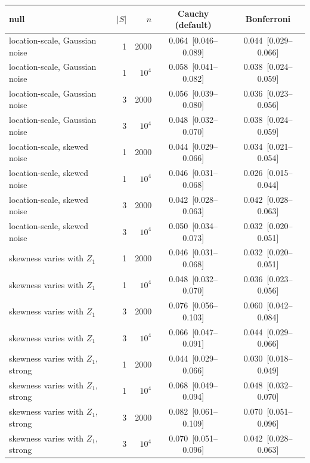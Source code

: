 \begin{tabular}{lrrcc}
\toprule
null & $|S|$ & $n$ & Cauchy (default) & Bonferroni \\
\midrule
location-scale, Gaussian noise & 1 & 2000 & 0.064~[0.046--0.089] & 0.044~[0.029--0.066] \\
location-scale, Gaussian noise & 1 & $10^4$ & 0.058~[0.041--0.082] & 0.038~[0.024--0.059] \\
location-scale, Gaussian noise & 3 & 2000 & 0.056~[0.039--0.080] & 0.036~[0.023--0.056] \\
location-scale, Gaussian noise & 3 & $10^4$ & 0.048~[0.032--0.070] & 0.038~[0.024--0.059] \\
location-scale, skewed noise & 1 & 2000 & 0.044~[0.029--0.066] & 0.034~[0.021--0.054] \\
location-scale, skewed noise & 1 & $10^4$ & 0.046~[0.031--0.068] & 0.026~[0.015--0.044] \\
location-scale, skewed noise & 3 & 2000 & 0.042~[0.028--0.063] & 0.042~[0.028--0.063] \\
location-scale, skewed noise & 3 & $10^4$ & 0.050~[0.034--0.073] & 0.032~[0.020--0.051] \\
skewness varies with $Z_1$ & 1 & 2000 & 0.046~[0.031--0.068] & 0.032~[0.020--0.051] \\
skewness varies with $Z_1$ & 1 & $10^4$ & 0.048~[0.032--0.070] & 0.036~[0.023--0.056] \\
skewness varies with $Z_1$ & 3 & 2000 & 0.076~[0.056--0.103] & 0.060~[0.042--0.084] \\
skewness varies with $Z_1$ & 3 & $10^4$ & 0.066~[0.047--0.091] & 0.044~[0.029--0.066] \\
skewness varies with $Z_1$, strong & 1 & 2000 & 0.044~[0.029--0.066] & 0.030~[0.018--0.049] \\
skewness varies with $Z_1$, strong & 1 & $10^4$ & 0.068~[0.049--0.094] & 0.048~[0.032--0.070] \\
skewness varies with $Z_1$, strong & 3 & 2000 & 0.082~[0.061--0.109] & 0.070~[0.051--0.096] \\
skewness varies with $Z_1$, strong & 3 & $10^4$ & 0.070~[0.051--0.096] & 0.042~[0.028--0.063] \\
\bottomrule
\end{tabular}
